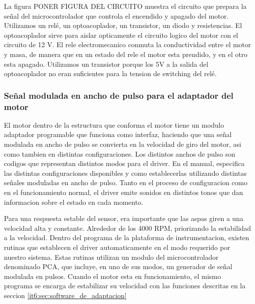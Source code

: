 La figura PONER FIGURA DEL CIRCUITO muestra el circuito que prepara la señal del microcontrolador que controla el encendido y apagado del motor. Utilizamos un relé, un optoacoplador, un transistor, un diodo y resistencias. El optoacoplador sirve para aislar opticamente el circuito logico del motor con el circuito de 12 V. El rele electromecanico conmuta la conductividad entre el motor y masa, de manera que en un estado del rele el motor esta prendido, y en el otro esta apagado. Utilizamos un transistor porque los 5V a la salida del optoacoplador no eran suficientes para la tension de switching del relé.


\subsubsection{Señal modulada en ancho de pulso para el adaptador del motor} %
\label{it6:ssub:señal_modulada_en_ancho_de_pulso_para_el_adaptador_del_motor}


El motor dentro de la estructura que conforma el motor tiene un modulo adaptador programable que funciona como interfaz, haciendo que una señal modulada en ancho de pulso se convierta en la velocidad de giro del motor, asi como tambien en distintas configuraciones. Los distintos anchos de pulso son codigos que representan distintos modos para el driver. En el manual, especifica las distintas configuraciones disponibles y como establecerlas utilizando distintas señales moduladas en ancho de pulso. Tanto en el proceso de configuracion como en el funcionamiento normal, el driver emite sonidos en distintos tonos que dan informacion sobre el estado en cada momento.

Para una respuesta estable del sensor, era importante que las aspas giren a una velocidad alta y constante. Alrededor de los 4000 RPM, priorizando la estabilidad a la velocidad. Dentro del programa de la plataforma de instrumentacion, existen rutinas que establecen el driver automaticamente en el modo requerido por nuestro sistema. Estas rutinas utilizan un modulo del microcontrolador denominado PCA, que incluye, en uno de sus modos, un generador de señal modulada en pulsos. Cuando el motor esta en funcionamiento, el mismo programa se encarga de estabilizar su velocidad con las funciones descritas en la seccion \ref{it6:sec:software_de_adaptacion}


